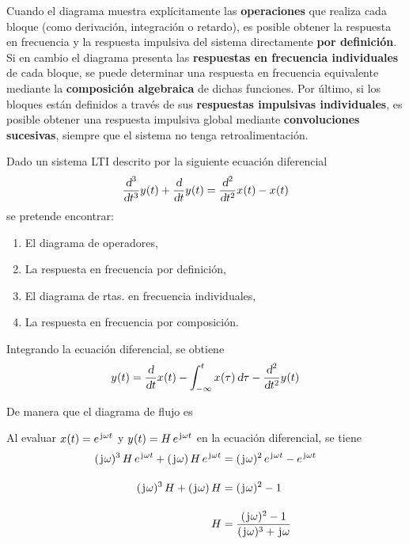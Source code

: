 Cuando el diagrama muestra explícitamente las \textbf{operaciones} que realiza cada bloque (como derivación, integración o retardo), es posible obtener la respuesta en frecuencia y la respuesta impulsiva del sistema directamente \textbf{por definición}.
Si en cambio el diagrama presenta las \textbf{respuestas en frecuencia individuales} de cada bloque, se puede determinar una respuesta en frecuencia equivalente mediante la \textbf{composición algebraica} de dichas funciones.
Por último, si los bloques están definidos a través de sus \textbf{respuestas impulsivas individuales}, es posible obtener una respuesta impulsiva global mediante \textbf{convoluciones sucesivas}, siempre que el sistema no tenga retroalimentación.

\begin{mdframed}[style=ExampleFrame]
    \begin{example}
    \end{example}
    Dado un sistema LTI descrito por la siguiente ecuación diferencial
    \[
        \deriv[^3]{t^3} \fx[y]{t} + \deriv{t} \fx[y]{t}
        = \deriv[^2]{t^2} \fx[x]{t} - \fx[x]{t}
    \]
    se pretende encontrar:

    \begin{enumerate}
        \item El diagrama de operadores,
        \item La respuesta en frecuencia por definición,
        \item El diagrama de rtas. en frecuencia individuales,
        \item La respuesta en frecuencia por composición.
    \end{enumerate}


    Integrando la ecuación diferencial, se obtiene
    \[
        \fx[y]{t} = \deriv{t} \fx[x]{t} - \int_{-\infty}^{t} \fx[x]{\tau} \dif \tau - \deriv[^2]{t^2} \fx[y]{t}
    \]

    De manera que el diagrama de flujo es

    \begin{center}
        \def\svgwidth{\linewidth}
        
    \end{center}


    Al evaluar $\fx[x]{t} = \complexExp$ y $\fx[y]{t} = H \, \complexExp$ en la ecuación diferencial, se tiene
    \begin{align*}
        (\iu \omega)^3 \, H \, \complexExp + (\iu \omega) \, H \, \complexExp
        & = (\iu \omega)^2 \, \complexExp - \complexExp
        \\[1em]
        (\iu \omega)^3 \, H + (\iu \omega) \, H
        & = (\iu \omega)^2 - 1
        \\[1em]
        H
        & = \frac{(\iu \omega)^2 - 1}{(\iu \omega)^3 + \iu \omega}
    \end{align*}


\end{mdframed}
